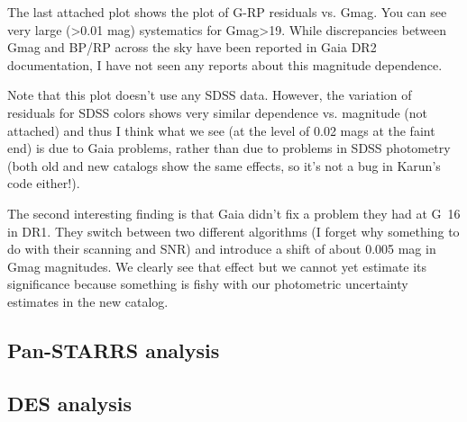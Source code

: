 The last attached plot shows the plot of G-RP residuals vs. Gmag. You can see very
large (>0.01 mag) systematics for Gmag>19. While discrepancies between Gmag
and BP/RP across the sky have been reported in Gaia DR2 documentation, I have
not seen any reports about this magnitude dependence. 

Note that this plot doesn’t use any SDSS data. However, the variation of residuals
for SDSS colors shows very similar dependence vs. magnitude (not attached) and 
thus I think what we see (at the level of 0.02 mags at the faint end) is due to Gaia 
problems, rather than due to problems in SDSS photometry (both old and new 
catalogs show the same effects, so it’s not a bug in Karun’s code either!). 

The second interesting finding is that Gaia didn’t fix a problem they had at G~16
in DR1. They switch between two different algorithms (I forget why something to 
do with their scanning and SNR) and introduce a shift of about 0.005 mag in Gmag 
magnitudes. We clearly see that effect but we cannot yet estimate its significance 
because something is fishy with our photometric uncertainty estimates in the new 
catalog.  



\subsection{Pan-STARRS analysis}


\subsection{DES analysis}


